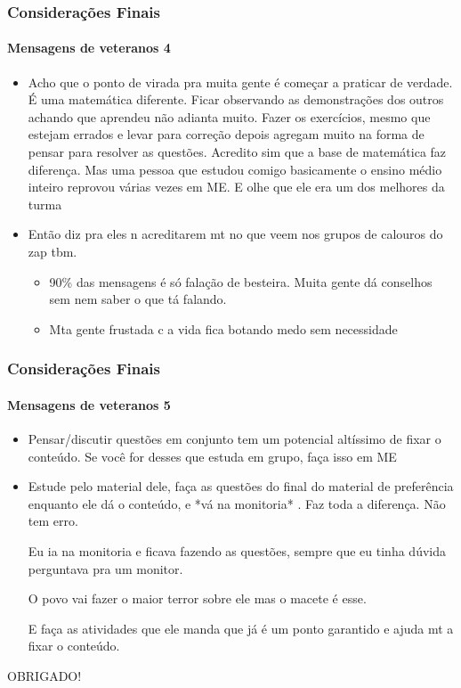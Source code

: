 \begin{frame}
	\frametitle{Considerações Finais}
	\framesubtitle{Mensagens de veteranos 4}

	\begin{itemize}
		\item Acho que o ponto de virada pra muita gente é começar a praticar de verdade. É uma matemática diferente. Ficar observando as demonstrações dos outros achando que aprendeu não adianta muito. Fazer os exercícios, mesmo que estejam errados e levar para correção depois agregam muito na forma de pensar para resolver as questões. Acredito sim que a base de matemática faz diferença. Mas uma pessoa que estudou comigo basicamente o ensino médio inteiro reprovou várias vezes em ME. E olhe que ele era um dos melhores da turma
		\item Então diz pra eles n acreditarem mt no que veem nos grupos de calouros do zap tbm.
		\begin{itemize}
			\item 90\% das mensagens é só falação de besteira. Muita gente dá conselhos sem nem saber o que tá falando.
			\item Mta gente frustada c a vida fica botando medo sem necessidade
		\end{itemize}
	\end{itemize}

\end{frame}


\begin{frame}
	\frametitle{Considerações Finais}
	\framesubtitle{Mensagens de veteranos 5}

	\begin{itemize}
		\item Pensar/discutir questões em conjunto tem um potencial altíssimo de fixar o conteúdo. Se você for desses que estuda em grupo, faça isso em ME
		\item Estude pelo material dele, faça as questões do final do material de preferência enquanto ele dá o conteúdo, e *vá na monitoria* . Faz toda a diferença. Não tem erro.

		Eu ia na monitoria e ficava fazendo as questões, sempre que eu tinha dúvida perguntava pra um monitor.
		
		O povo vai fazer o maior terror sobre ele mas o macete é esse. 
		
		E faça as atividades que ele manda que já é um ponto garantido e ajuda mt a fixar o conteúdo.\pause
	\end{itemize}
	
	\vspace{1.8cm}

	\begin{center}
		\begin{large}
			OBRIGADO!
		\end{large}
	\end{center}

\end{frame}
